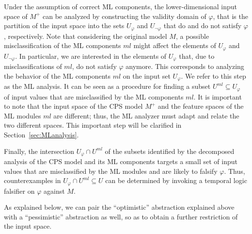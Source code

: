 Under the assumption of correct ML components, the lower-dimensional input space
of $M^+$ can be analyzed by constructing the validity domain of $\varphi$, that is 
the partition of the input space into the sets $U_\varphi$ and $U_{\neg\varphi}$
that do and do not satisfy $\varphi$, respectively.
Note that considering the original model $M$, a possible misclassification of the ML components $ml$ might affect
the elements of $U_\varphi$ and $U_{\neg\varphi}$. In particular, we
are interested in the elements of $U_\varphi$ that, due to misclassifications of $ml$, do not satisfy $\varphi$ anymore.
This corresponds to analyzing the behavior of the ML components $ml$ on the input set $U_\varphi$.
We refer to this step as the ML analysis. It can be seen as a procedure
for finding a subset $U^{ml} \subseteq U_\varphi$ of input values
that are misclassified by the ML components $ml$.
It is important to note that the input space 
of the CPS model $M^+$ and the feature spaces of the ML modules $ml$ are 
different; thus, the ML analyzer must adapt and relate the two 
different spaces. This important step will be clarified in
Section~\ref{sec:MLanalysis}.

Finally, the intersection $U_\varphi \cap U^{ml}$  of the subsets identified by the decomposed 
analysis of the CPS model and its ML components targets a small set of input values that 
are misclassified by the ML modules and are likely to falsify $\varphi$.
Thus, counterexamples in $U_\varphi \cap U^{ml} \subseteq U$ can be determined
by invoking a temporal logic falsifier on $\varphi$ against $M$.

As explained below, we can pair the ``optimistic'' abstraction explained above 
with a ``pessimistic'' abstraction as well, so as to obtain
a further restriction of the input space.

